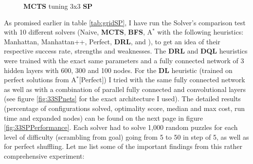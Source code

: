 \begin{figure}[H]
  \noindent
\caption[33SPPerformanceMCTS]{\textbf{MCTS} tuning 3x3 \textbf{SP}}
\label{fig:33SPPerformanceMCTS}
\end{figure}



\label{ssec:33SPSC}
\label{sec:S33DRLDQL}
As promised earlier in table \ref{tab:gridSP}, I have run the Solver's comparison test with 10 different solvers (Naive, \textbf{MCTS}, \textbf{BFS}, A$^{*}$ with the following heuristics: Manhattan, Manhattan++, Perfect, \textbf{DRL},  and ), to get an idea of their respective success rate, strengths and weaknesses. The \textbf{DRL} and \textbf{DQL} heuristics were trained with the exact same parameters and a fully connected network of 3 hidden layers with 600, 300 and 100 nodes. For the \textbf{DL} heuristic (trained on perfect solutions from A$^{*}$[Perfect]) I tried with the same fully connected network as well as with a combination of parallel fully connected and convolutional layers (see figure \ref{fig:33SPnets} for the exact architecture I used). The detailed results (percentage of configurations solved, optimality score, median and max cost, run time and expanded nodes) can be found on the next page  in figure \ref{fig:33SPPerformance}. Each solver had to solve 1,000 random puzzles for each level of difficulty (scrambling from goal) going from 5 to 50 in step of 5, as well as for perfect shuffling. Let me list some of the important findings from this rather comprehensive experiment:

